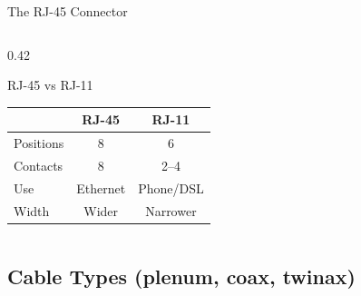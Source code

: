 \documentclass[aspectratio=169]{beamer}  %
\begin{document}
\begin{frame}{The RJ-45 Connector}
\begin{columns}[T]
\begin{column}{0.42\textwidth}
\begin{center}
            \end{center}
            
            \vspace{0.5em}
            \begin{block}{RJ-45 vs RJ-11}
                \centering
                \small
                \begin{tabular}{l c c}
                    & \textbf{RJ-45} & \textbf{RJ-11} \\
                    \hline
                    Positions & 8 & 6 \\
                    Contacts & 8 & 2--4 \\
                    Use & Ethernet & Phone/DSL \\
                    Width & Wider & Narrower \\
                \end{tabular}
            \end{block}
        \end{column}
    \end{columns}
\end{frame}

\subsection{Cable Types (plenum, coax, twinax)}
\end{document}
